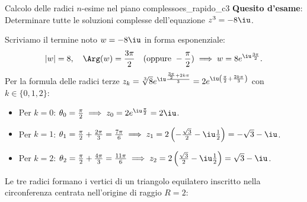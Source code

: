 \begin{esempio}{Calcolo delle radici $n$-esime nel piano complesso}{es_rapido_c3}
\textbf{Quesito d'esame}: Determinare tutte le soluzioni complesse dell'equazione $z^3 = -8\iu$.

\begin{dimostrazione}[Risoluzione]
Scriviamo il termine noto $w = -8\iu$ in forma esponenziale:
\begin{equation}
    |w| = 8, \quad \Arg(w) = \frac{3\pi}{2} \quad (\text{oppure } -\frac{\pi}{2}) \implies w = 8 e^{\iu \frac{3\pi}{2}}.
\end{equation}
Per la formula delle radici terze $z_k = \sqrt[3]{8} e^{\iu \frac{\frac{3\pi}{2} + 2k\pi}{3}} = 2 e^{\iu \left(\frac{\pi}{2} + \frac{2k\pi}{3}\right)}$ con $k \in \{0, 1, 2\}$:
\begin{itemize}
    \item Per $k = 0$: $\theta_0 = \frac{\pi}{2} \implies z_0 = 2 e^{\iu \frac{\pi}{2}} = 2\iu$.
    \item Per $k = 1$: $\theta_1 = \frac{\pi}{2} + \frac{2\pi}{3} = \frac{7\pi}{6} \implies z_1 = 2\left(-\frac{\sqrt{3}}{2} - \iu\frac{1}{2}\right) = -\sqrt{3} - \iu$.
    \item Per $k = 2$: $\theta_2 = \frac{\pi}{2} + \frac{4\pi}{3} = \frac{11\pi}{6} \implies z_2 = 2\left(\frac{\sqrt{3}}{2} - \iu\frac{1}{2}\right) = \sqrt{3} - \iu$.
\end{itemize}
Le tre radici formano i vertici di un triangolo equilatero inscritto nella circonferenza centrata nell'origine di raggio $R = 2$:

\begin{center}
\end{center}
\end{dimostrazione}
\end{esempio}

